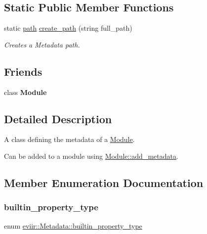 \subsection*{Static Public Member Functions}
\begin{DoxyCompactItemize}
\item 
static \hyperlink{classeviir_1_1Metadata_ac613e5de0552301f9b7969d14eb5dffa}{path} \hyperlink{classeviir_1_1Metadata_a39b71a74731f3357b5f0888c6b3ba3e4}{create\+\_\+path} (string full\+\_\+path)
\begin{DoxyCompactList}\small\item\em Creates a Metadata path. \end{DoxyCompactList}\end{DoxyCompactItemize}
\subsection*{Friends}
\begin{DoxyCompactItemize}
\item 
\mbox{\label{classeviir_1_1Metadata_a21f639900c480510650969df9c74d17d}} 
class {\bfseries Module}
\end{DoxyCompactItemize}


\subsection{Detailed Description}
A class defining the metadata of a \hyperlink{classeviir_1_1Module}{Module}. 

Can be added to a module using \hyperlink{classeviir_1_1Module_a9e4bc38ac7d619c039a0bb0559589399}{Module\+::add\+\_\+metadata}. 

\subsection{Member Enumeration Documentation}
\mbox{\label{classeviir_1_1Metadata_a372fe4af91ebc18a6d02354e8bcf23cf}} 
\subsubsection{\texorpdfstring{builtin\+\_\+property\+\_\+type}{builtin\_property\_type}}
{\footnotesize\ttfamily enum \hyperlink{classeviir_1_1Metadata_a372fe4af91ebc18a6d02354e8bcf23cf}{eviir\+::\+Metadata\+::builtin\+\_\+property\+\_\+type}}



